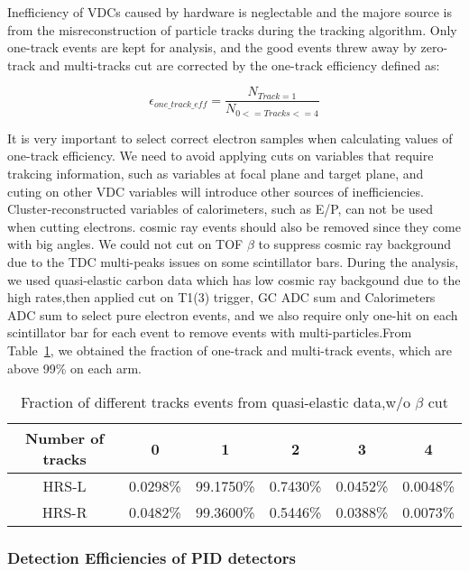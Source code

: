 Inefficiency of VDCs caused by hardware is neglectable and the majore source is from the misreconstruction of particle tracks during the tracking algorithm. Only one-track events are kept for analysis, and the good events threw away by zero-track and multi-tracks cut are corrected by the one-track efficiency defined as:

\begin{equation}
 \epsilon_{one\_track\_eff} = \frac{N_{Track=1}}{N_{0<=Tracks<=4}}
\end{equation}

 It is very important to select correct electron samples when calculating values of one-track efficiency. We need to avoid applying cuts on variables that require trakcing information, such as variables at focal plane and target plane, and cuting on other VDC variables will introduce other sources of inefficiencies. Cluster-reconstructed variables of calorimeters, such as E/P, can not be used when cutting electrons. cosmic ray events should also be removed since they come with big angles. We could not cut on TOF $\beta$ to suppress cosmic ray background due to the TDC multi-peaks issues on some scintillator bars. During the analysis, we used quasi-elastic carbon data which has low cosmic ray backgound due to the high rates,then applied cut on T1(3) trigger, GC ADC sum and Calorimeters ADC sum to select pure electron events, and we also require only one-hit on each scintillator bar for each event to remove events with multi-particles.From Table~\ref{vdc_table}, we obtained the fraction of one-track and multi-track events, which are above 99\% on each arm.

\begin{table}[h!]
\centering
\begin{tabular}{|c||ccccc|}
	\hline
\textbf{Number of tracks}  & 0 & 1 & 2 & 3 & 4     \\
	\hline \hline
HRS-L   & 0.0298\% & 99.1750\% & 0.7430\% & 0.0452\% & 0.0048\%  \\
        \hline
HRS-R   & 0.0482\% & 99.3600\% & 0.5446\% & 0.0388\% & 0.0073\%  \\
	\hline \hline
\end{tabular}
\caption{Fraction of different tracks events from quasi-elastic data,w/o $\beta$ cut}
\label{vdc_table}	
\end{table}



\subsubsection{Detection Efficiencies of PID detectors}


